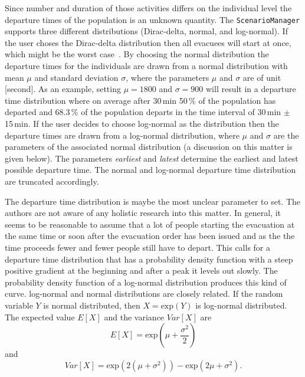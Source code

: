 \begin{itemize}
Since number and duration of those activities differs on the individual level the departure times of the population is an unknown quantity. The \lstinline+ScenarioManager+ supports three different distributions (Dirac-delta, normal, and log-normal). If the user choses the Dirac-delta distribution then all evacuees will start at once, which might be the worst case~\citep{LaemmelKluepfel2012InfluenceOfDepartureTimeDistribution}. By choosing the normal distribution the departure times for the individuals are drawn from a normal distribution with mean $\mu$ and standard deviation $\sigma$, where the parameters $\mu$ and $\sigma$ are of unit [second]. As an example, setting $\mu = 1800$ and $\sigma =  900$ will result in a departure time distribution where on average after 30\,min 50\,\% of the population has departed and 68.3\,\% of the population departs in the time interval of 30\,min $\pm$ 15\,min. If the user decides to choose log-normal as the distribution then the departure times are drawn from a log-normal distribution, where $\mu$ and $\sigma$ are the parameters of the associated normal distribution (a discussion on this matter is given below). The parameters \emph{earliest} and \emph{latest} determine the earliest and latest possible departure time. The normal and log-normal departure time distribution are truncated accordingly.
\end{itemize}
The departure time distribution is maybe the most unclear parameter to set. The authors are not aware of any holistic research into this matter. 
In general, it seems to be reasonable to assume that a lot of people starting the evacuation at the same time or soon after the evacuation order has been issued and as the the time proceeds fewer and fewer people still have to depart. 
This calls for a departure time distribution that has a probability density function with a steep positive gradient at the beginning and after a peak it levels out slowly. The probability density function of a log-normal distribution produces this kind of curve. log-normal and normal distributions are closely related. If the random variable $Y$ is normal distributed, then $X = \text{exp}(Y)$ is log-normal distributed. The expected value $E[X]$  and the variance $Var[X]$ are
\begin{equation}
E[X] = \text{exp}(\mu + \frac{\sigma^2}{2})
\end{equation}
and 
\begin{equation}
Var[X]=\text{exp}(2(\mu+\sigma^2))-\text{exp}(2\mu+\sigma^2).
\end{equation}
